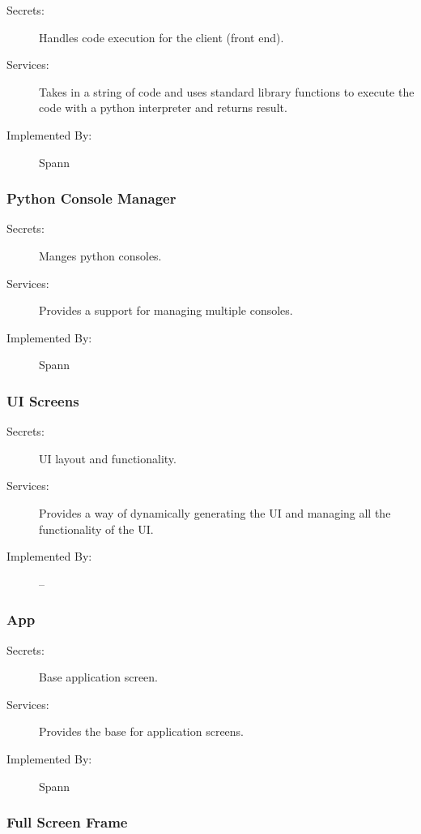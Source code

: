 \documentclass[12pt, titlepage]{article}
\begin{document}
\begin{description}
    \item[Secrets:] Handles code execution for the client (front end).
\item[Services:] Takes in a string of code and uses standard library functions
    to execute the code with a python interpreter and returns result.
\item[Implemented By:] Spann
\end{description}

\subsubsection{Python Console Manager} \label{mdPythonConsoleManager}

\begin{description}
\item[Secrets:] Manges python consoles.
\item[Services:] Provides a support for managing multiple consoles.
\item[Implemented By:] Spann
\end{description}

\subsubsection{UI Screens} \label{mdUIScreens}

\begin{description}
\item[Secrets:] UI layout and functionality.
\item[Services:] Provides a way of dynamically generating the UI and managing
    all the functionality of the UI.
\item[Implemented By:] --
\end{description}

\subsubsection{App} \label{mdApp}

\begin{description}
\item[Secrets:] Base application screen.
\item[Services:] Provides the base for application screens.
\item[Implemented By:] Spann
\end{description}

\subsubsection{Full Screen Frame} \label{mdFullScreenFrame}
\end{document}
